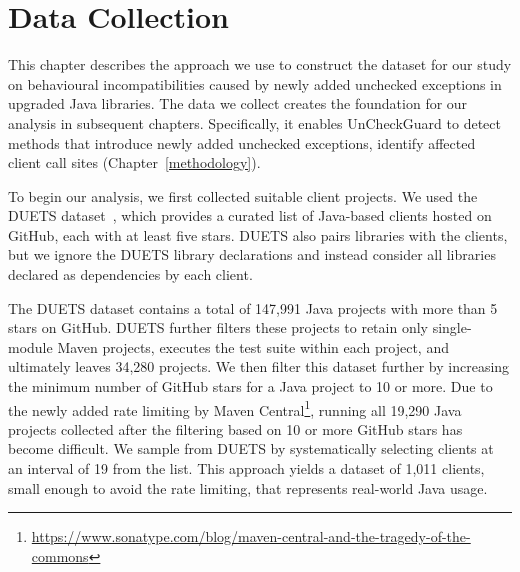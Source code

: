 \chapter{Data Collection}\label{data}

This chapter describes the approach we use to construct the dataset for our study on behavioural incompatibilities caused by newly added unchecked exceptions in upgraded Java libraries. The data we collect creates the foundation for our analysis in subsequent chapters. Specifically, it enables UnCheckGuard to detect methods that introduce newly added unchecked exceptions, identify affected client call sites (Chapter~\ref{methodology}).


To begin our analysis, we first collected suitable client projects. We used the DUETS dataset~\cite{durieux21:_duets}, which provides a curated list of Java-based clients hosted on GitHub, each with at least five stars. DUETS also pairs libraries with the clients, but we ignore the DUETS library declarations and instead consider all libraries declared as dependencies by each client.

The DUETS dataset contains a total of 147,991 Java projects with more than 5 stars on GitHub. DUETS further filters these projects to retain only single-module Maven projects, executes the test suite within each project, and ultimately leaves 34,280 projects. We then filter this dataset further by increasing the minimum number of GitHub stars for a Java project to 10 or more. Due to the newly added rate limiting by Maven Central\footnote{\tiny \url{https://www.sonatype.com/blog/maven-central-and-the-tragedy-of-the-commons}}, running all 19,290 Java projects collected after the filtering based on 10 or more GitHub stars has become difficult. We sample from DUETS by systematically selecting clients at an interval of 19 from the list. This approach yields a dataset of 1,011 clients, small enough to avoid the rate limiting, that represents real-world Java usage.

